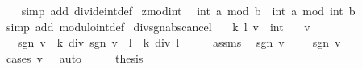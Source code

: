 \begin{isabellebody}
%
\isadelimproof
\ \ %
\endisadelimproof
%
\isatagproof
{}\isamarkupfalse%
\ {\isacharparenleft}{\kern0pt}simp\ add{\isacharcolon}{\kern0pt}\ divide{\isacharunderscore}{\kern0pt}int{\isacharunderscore}{\kern0pt}def{\isacharparenright}{\kern0pt}%
\endisatagproof
{\isafoldproof}%
%
\isadelimproof
\isanewline
%
\endisadelimproof
\isanewline
{}\isamarkupfalse%
\ zmod{\isacharunderscore}{\kern0pt}int{\isacharcolon}{\kern0pt}\isanewline
\ \ {\isachardoublequoteopen}int\ {\isacharparenleft}{\kern0pt}a\ mod\ b{\isacharparenright}{\kern0pt}\ {\isacharequal}{\kern0pt}\ int\ a\ mod\ int\ b{\isachardoublequoteclose}\isanewline
%
\isadelimproof
\ \ %
\endisadelimproof
%
\isatagproof
{}\isamarkupfalse%
\ {\isacharparenleft}{\kern0pt}simp\ add{\isacharcolon}{\kern0pt}\ modulo{\isacharunderscore}{\kern0pt}int{\isacharunderscore}{\kern0pt}def{\isacharparenright}{\kern0pt}%
\endisatagproof
{\isafoldproof}%
%
\isadelimproof
\isanewline
%
\endisadelimproof
\isanewline
{}\isamarkupfalse%
\ div{\isacharunderscore}{\kern0pt}sgn{\isacharunderscore}{\kern0pt}abs{\isacharunderscore}{\kern0pt}cancel{\isacharcolon}{\kern0pt}\isanewline
\ \ \ k\ l\ v\ {\isacharcolon}{\kern0pt}{\isacharcolon}{\kern0pt}\ int\isanewline
\ \ \ {\isachardoublequoteopen}v\ {\isasymnoteq}\ {}{\isachardoublequoteclose}\isanewline
\ \ \ {\isachardoublequoteopen}{\isacharparenleft}{\kern0pt}sgn\ v\ {\isacharasterisk}{\kern0pt}\ {\isasymbar}k{\isasymbar}{\isacharparenright}{\kern0pt}\ div\ {\isacharparenleft}{\kern0pt}sgn\ v\ {\isacharasterisk}{\kern0pt}\ {\isasymbar}l{\isasymbar}{\isacharparenright}{\kern0pt}\ {\isacharequal}{\kern0pt}\ {\isasymbar}k{\isasymbar}\ div\ {\isasymbar}l{\isasymbar}{\isachardoublequoteclose}\isanewline
%
\isadelimproof
%
\endisadelimproof
%
\isatagproof
{}\isamarkupfalse%
\ {\isacharminus}{\kern0pt}\isanewline
\ \ \isamarkupfalse%
\ assms\ \isamarkupfalse%
\ {\isachardoublequoteopen}sgn\ v\ {\isacharequal}{\kern0pt}\ {\isacharminus}{\kern0pt}\ {}\ {\isasymor}\ sgn\ v\ {\isacharequal}{\kern0pt}\ {}{\isachardoublequoteclose}\isanewline
\ \ \ \ \isamarkupfalse%
\ {\isacharparenleft}{\kern0pt}cases\ {\isachardoublequoteopen}v\ {\isasymge}\ {}{\isachardoublequoteclose}{\isacharparenright}{\kern0pt}\ auto\isanewline
\ \ \isamarkupfalse%
\ \isamarkupfalse%
\ {\isacharquery}{\kern0pt}thesis\isanewline
\ \ \ \ \isamarkupfalse%

\end{isabellebody}
